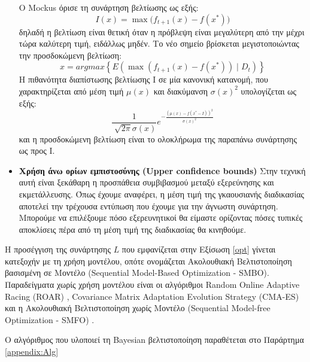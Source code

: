 \begin{itemize}
 		O Mockus όρισε τη συνάρτηση βελτίωσης ως εξής:
 		\begin{equation}
 		I(x)= \max \Big( f_{t+1} (x) - f(x^*) \Big)
 		\end{equation}
 		δηλαδή η βελτίωση είναι θετική όταν η πρόβλεψη είναι μεγαλύτερη από την μέχρι τώρα καλύτερη τιμή, ειδάλλως μηδέν. Το νέο σημείο βρίσκεται μεγιστοποιώντας την προσδοκώμενη βελτίωση:
 		\begin{equation}
 		x=argmax \left \{ E( \max( f_{t+1}(x) - f(x^*)) \mid D_t) \right \}
 		\end{equation}
 		H πιθανότητα διαπίστωσης βελτίωσης I σε μία κανονική κατανομή, που χαρακτηρίζεται από μέση τιμή $\mu(x)$ και διακύμανση $\sigma(x)^2$ υπολογίζεται ως εξής:
 		\begin{equation}\frac{1}{\sqrt[]{2 \pi} \sigma(x)} e^{- \frac{(\mu(x)- f(x^*-I))^2}{\sigma(x)^2}}
 		\end{equation} 
 		και η προσδοκώμενη βελτίωση είναι το ολοκλήρωμα της παραπάνω συνάρτησης ως προς I.
 		\item \textbf{Χρήση άνω ορίων εμπιστοσύνης (Upper confidence bounds)} Στην τεχνική αυτή είναι ξεκάθαρη η προσπάθεια συμβιβασμού μεταξύ εξερεύνησης και εκμετάλλευσης. Όπως έχουμε αναφέρει, η μέση τιμή της γκαουσιανής διαδικασίας αποτελεί την τρέχουσα εντύπωση που έχουμε για την άγνωστη συνάρτηση. Μπορούμε να επιλέξουμε πόσο εξερευνητικοί θα είμαστε ορίζοντας πόσες τυπικές αποκλίσεις πέρα από τη μέση τιμή της διαδικασίας θα κινηθούμε.
 	\end{itemize} 	
 	
 	Η προσέγγιση της συνάρτησης $L$ που εμφανίζεται στην Εξίσωση \ref{opt} γίνεται κατεξοχήν με τη χρήση μοντέλου, οπότε ονομάζεται Ακολουθιακή Βελτιστοποίηση βασισμένη σε Μοντέλο (Sequential Model-Based Optimization - \gls{SMBO}). Παραδείγματα χωρίς χρήση μοντέλου είναι οι αλγόριθμοι Random Online Adaptive Racing (ROAR) \citep{Hutter2011}, Covari\-ance Matrix Adaptation Evolution Strategy (CMA-ES) \citep{DBLP:journals/corr/LoshchilovH16} και η Ακολουθιακή Βελτιστοποίηση χωρίς Μοντέλο (Sequen\-tial Model-free Optimization - \gls{SMFO})  \citep{7373431}. 
 	
 	
 Ο αλγόριθμος που υλοποιεί τη Bayesian βελτιστοποίηση παραθέτεται στο Παράρτημα \ref{appendix:Alg}
